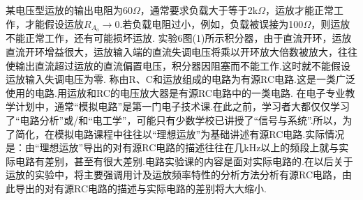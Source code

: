 \documentclass[a4paper]{article}
\begin{document}
某电压型运放的输出电阻为60$\Omega$，通常要求负载大于等于2k$\Omega$，运放才能正常工作，才能假设运放$R_{A_o}\to0$.若负载电阻过小，例如，负载被误接为100$\Omega$，则运放不能正常工作，还有可能损坏运放.
实验6图(1)所示积分器，由于直流开环，运放直流开环增益很大，运放输入端的直流失调电压将乘以开环放大倍数被放大，往往使输出直流超过运放的直流偏置电压，积分器因阻塞而不能工作.这时就不能假设运放输入失调电压为零.
称由R、C和运放组成的电路为有源RC电路.这是一类广泛使用的电路.用运放和RC的电压放大器是有源RC电路中的一类电路.
在电子专业教学计划中，通常“模拟电路”是第一门电子技术课.在此之前，学习者大都仅仅学习了“电路分析”或/和“电工学”，可能只有少数学校已讲授了“信号与系统”.所以，为了简化，在模拟电路课程中往往以“理想运放”为基础讲述有源RC电路.实际情况是：由“理想运放”导出的对有源RC电路的描述往往在几kHz以上的频段上就与实际电路有差别，甚至有很大差别.电路实验课的内容是面对实际电路的.在以后关于运放的实验中，将主要强调用计及运放频率特性的分析方法分析有源RC电路，由此导出的对有源RC电路的描述与实际电路的差别将大大缩小.
\end{document}
